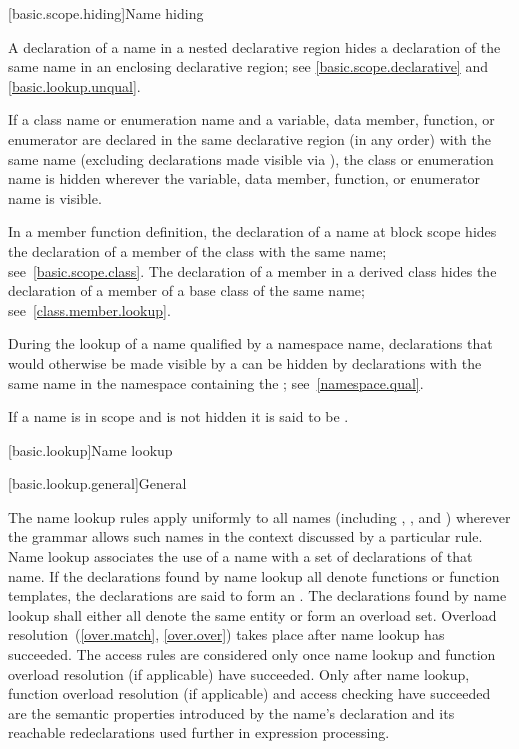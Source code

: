 [basic.scope.hiding]{Name hiding}

\pnum
{}%
%
%
A declaration of a name in a nested declarative region
hides a declaration of the same name in an enclosing declarative region;
see \ref{basic.scope.declarative} and \ref{basic.lookup.unqual}.

\pnum
{}%
If a class name or enumeration name and
a variable, data member, function, or enumerator
are declared in the same declarative region (in any order) with the
same name (excluding declarations made visible
via ),
the class or enumeration name is hidden wherever the variable, data member,
function, or enumerator name is visible.

\pnum
In a member function definition, the declaration of a name
at block scope
hides
the declaration of a member of the class with the same name;
see~\ref{basic.scope.class}. The declaration of a member in a derived
class hides the declaration of a member of
a base class of the same name; see~\ref{class.member.lookup}.

\pnum
During the lookup of a name qualified by a namespace name, declarations
that would otherwise be made visible by a  can
be hidden by declarations with the same name in the namespace containing
the ; see~\ref{namespace.qual}.

\pnum
{}%
If a name is in scope and is not hidden it is said to be .%

[basic.lookup]{Name lookup}%

[basic.lookup.general]{General}%
%
%

\pnum
The name lookup rules apply uniformly to all names (including
,
, and
) wherever the grammar allows
such names in the context discussed by a particular rule. Name lookup
associates the use of a name with a set of declarations of
that name.
If the declarations found by name lookup
all denote functions or function templates,
the declarations are said to form an .
The declarations found by name lookup shall either
all denote the same entity or form an overload set.
Overload resolution~(\ref{over.match}, \ref{over.over})
takes place after name lookup has succeeded. The access rules
are considered only once name lookup and
function overload resolution (if applicable) have succeeded. Only after
name lookup, function overload resolution (if applicable) and access
checking have succeeded
are the semantic properties introduced by the name's declaration
and its reachable redeclarations
used further in expression processing.

